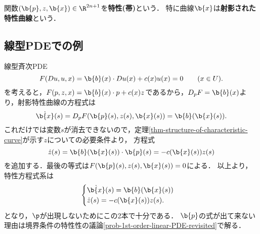 \documentclass[uplatex,dvipdfmx]{jsreport}
\begin{document}
\begin{definition}
    関数$(\b{p},z,\b{x})\in\R^{2n+1}$を\textbf{特性(帯)}という．
    特に曲線$\b{x}$は\textbf{射影された特性曲線}という．
\end{definition}

\subsection{線型PDEでの例}

\begin{problem}[線型斉次PDEの特性方程式系]\label{prob-1st-order-linear-PDE}
    線型斉次PDE
    \[F(Du,u,x)=\b{b}(x)\cdot Du(x)+c(x)u(x)=0\qquad(x\in U).\]
    を考えると，$F(p,z,x)=\b{b}(x)\cdot p+c(x)z$であるから，$D_pF=\b{b}(x)$より，射影特性曲線の方程式は
    \[\dot{\b{x}}(s)=D_pF(\b{p}(s),z(s),\b{x}(s))=\b{b}(\b{x}(s)).\]
    これだけでは変数$s$が消去できないので，定理\ref{thm-structure-of-characteristic-curve}が示す$z$についての必要条件より，
    方程式
    \[\dot{z}(s)=\b{b}(\b{x}(s))\cdot\b{p}(s)=-c(\b{x}(s))z(s)\]
    を追加する．最後の等式は$F(\b{p}(s),z(s),\b{x}(s))=0$による．
    以上より，特性方程式系は
    \[\begin{cases}
        \dot{\b{x}}(s)=\b{b}(\b{x}(s))\\
        \dot{z}(s)=-c(\b{x}(s))z(s).
    \end{cases}\]
    となり，$\p$が出現しないためにこの2本で十分である．
    $\b{p}$の式が出て来ない理由は境界条件の特性性の議論\ref{prob-1st-order-linear-PDE-revisited}で解る．
\end{problem}
\end{document}
